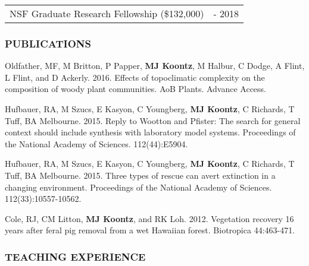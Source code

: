 \documentclass[11pt,english]{article}
\begin{document}
\begin{tabular}{>{\raggedright}p{5in}>{\raggedleft}p{1in}}
NSF Graduate Research Fellowship (\$132,000) & 2013 - 2018
\end{tabular}



\vspace{1.5ex}
\subsubsection*{PUBLICATIONS}
\vspace{-0.5ex}

\begin{hangparas}{.5in}{1}

\hspace{0.575em}Oldfather, MF, M Britton, P Papper, \textbf{MJ Koontz}, M Halbur, C Dodge, A Flint, L Flint, and D Ackerly. 2016. Effects of topoclimatic complexity on the composition of woody plant communities. AoB Plants. Advance Access.

\hspace{0.575em}Hufbauer, RA, M Szucs, E Kasyon, C Youngberg, \textbf{MJ Koontz}, C Richards, T Tuff, BA Melbourne. 2015. Reply to Wootton and Pfister: The search for general context should include synthesis with laboratory model systems. Proceedings of the National Academy of Sciences. 112(44):E5904.

\hspace{0.575em}Hufbauer, RA, M Szucs, E Kasyon, C Youngberg, \textbf{MJ Koontz}, C Richards, T Tuff, BA Melbourne. 2015. Three types of rescue can avert extinction in a changing environment. Proceedings of the National Academy of Sciences. 112(33):10557-10562.

\hspace{0.575em}Cole, RJ, CM Litton, \textbf{MJ Koontz}, and RK
Loh. 2012. Vegetation recovery 16 years after feral pig removal from
a wet Hawaiian forest. Biotropica 44:463-471.

\end{hangparas}
\vspace{1ex}


\vspace{1.5ex}
\subsubsection*{TEACHING EXPERIENCE}
\vspace{-0.5ex}
\end{document}
